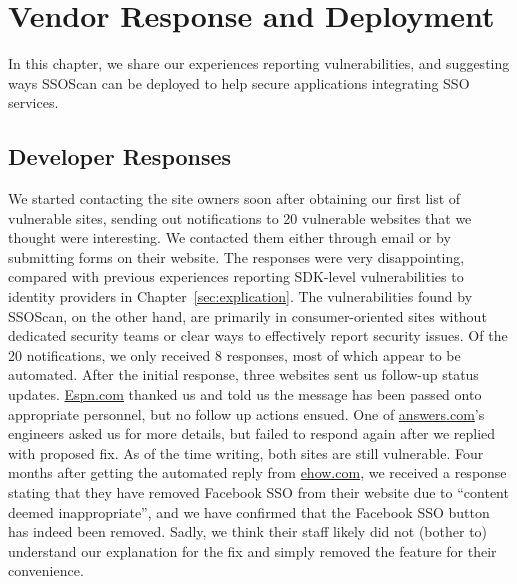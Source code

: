 \section{Vendor Response and Deployment}
\label{sec:ssoscan_deployment}

In this chapter, we share our experiences reporting vulnerabilities, and suggesting ways SSOScan can be deployed to help secure applications integrating SSO services.

\subsection{Developer Responses}
\label{sec:ssoscan_deployment_developerResponses}

We started contacting the site owners soon after obtaining our first list of vulnerable sites, sending out notifications to 20 vulnerable websites that we thought were interesting.  We contacted them either through email or by submitting forms on their website.  The responses were very disappointing, compared with previous experiences reporting SDK-level vulnerabilities to identity providers in Chapter~\ref{sec:explication}.  The vulnerabilities found by SSOScan, on the other hand, are primarily in consumer-oriented sites without dedicated security teams or clear ways to effectively report security issues.  Of the 20 notifications, we only received 8 responses, most of which appear to be automated.  After the initial response, three websites sent us follow-up status updates.  \url{Espn.com} thanked us and told us the message has been passed onto appropriate personnel, but no follow up actions ensued.  One of \url{answers.com}'s engineers asked us for more details, but failed to respond again after we replied with proposed fix.  As of the time writing, both sites are still vulnerable.  Four months after getting the automated reply from \url{ehow.com}, we received a response stating that they have removed Facebook SSO from their website due to ``content deemed inappropriate'', and we have confirmed that the Facebook SSO button has indeed been removed.  Sadly, we think their staff likely did not (bother to) understand our explanation for the fix and simply removed the feature for their convenience.

